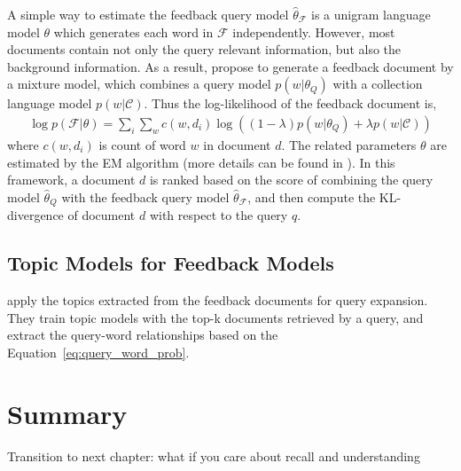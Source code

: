 A simple way to estimate the feedback query model $\hat{\theta}_{\mathcal{F}}$ is a unigram language model $\theta$ which generates each word in $\mathcal{F}$ independently. However, most documents contain not only the query relevant information, but also the background information. As a result, \cite{zhai-01b} propose to generate a feedback document by a mixture model, which combines a query model $p(w|\theta_Q)$ with a collection language model $p(w|\mathcal{C})$. Thus the log-likelihood of the feedback document is,
\begin{align}
\log p(\mathcal{F}|\theta) = \sum_i \sum_w c(w, d_i) \log((1-\lambda)p(w|\theta_Q) + \lambda p(w|\mathcal{C}))
\end{align}
where $c(w, d_i)$ is count of word $w$ in document $d$. The related parameters $\theta$ are estimated by the EM algorithm (more details can be found in \cite{zhai-01b}). In this framework, a document $d$ is ranked based on the score of combining the query model $\hat{\theta}_Q$ with the feedback query model $\hat{\theta}_\mathcal{F}$, and then compute the KL-divergence of document $d$ with respect to the query $q$. 

\subsection{Topic Models for Feedback Models}

\cite{Yi-2009} apply the topics extracted from the feedback documents for query expansion. They train topic models with the top-k documents retrieved by a query, and extract the query-word relationships based on the Equation~\ref{eq:query_word_prob}.




\section{Summary}

Transition to next chapter: what if you care about recall and understanding




